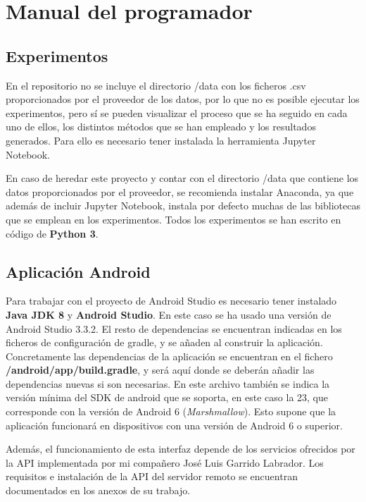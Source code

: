 \section{Manual del programador}

\subsection{Experimentos} 

En el repositorio no se incluye el directorio /data con los ficheros .csv proporcionados por el proveedor de los datos, por lo que no es posible ejecutar los experimentos, pero sí se pueden visualizar el proceso que se ha seguido en cada uno de ellos, los distintos métodos que se han empleado y los resultados generados. Para ello es necesario tener instalada la herramienta Jupyter Notebook. 

En caso de heredar este proyecto y contar con el directorio /data que contiene los datos proporcionados por el proveedor, se recomienda instalar Anaconda, ya que además de incluir Jupyter Notebook, instala por defecto muchas de las bibliotecas que se emplean en los experimentos. Todos los experimentos se han escrito en código de \textbf{Python 3}. 

\subsection{Aplicación Android}

Para trabajar con el proyecto de Android Studio es necesario tener instalado \textbf{Java JDK 8} y \textbf{Android Studio}. En este caso se ha usado una versión de Android Studio 3.3.2. El resto de dependencias se encuentran indicadas en los ficheros de configuración de gradle, y se añaden al construir la aplicación. Concretamente las dependencias de la aplicación se encuentran en el fichero \textbf{/android/app/build.gradle}, y será aquí donde se deberán añadir las dependencias nuevas si son necesarias. En este archivo también se indica la versión mínima del SDK de android que se soporta, en este caso la 23, que corresponde con la versión de Android 6 (\textit{Marshmallow}). Esto supone que la aplicación funcionará en dispositivos con una versión de Android 6 o superior. 

Además, el funcionamiento de esta interfaz depende de los servicios ofrecidos por la API implementada por mi compañero José Luis Garrido Labrador. Los requisitos e instalación de la API del servidor remoto se encuentran documentados en los anexos de su trabajo. 

